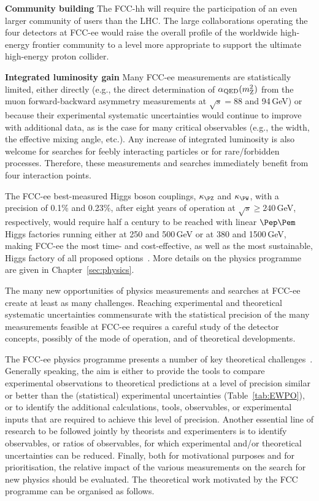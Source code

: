 \begin{tcolorbox}[colback=green!5!white,
                  colframe=green!75!black,
                  title=The benefits of four interaction points
                 ]
{\bf Community building} 
The FCC-hh will require the participation of an even larger community of users than the LHC. 
The large collaborations operating the four detectors at FCC-ee would raise the overall profile of the worldwide high-energy frontier community to a level more appropriate to support the ultimate high-energy proton collider.

{\bf Integrated luminosity gain} 
Many FCC-ee measurements are statistically limited, either directly (e.g., the direct determination of $\alpha_{\rm QED}(m_{\rm Z}^2)$ from the muon forward-backward asymmetry measurements at $\sqrt{s}=88$ and 94\,GeV) or because their experimental systematic uncertainties would continue to improve with additional data, as is the case for many critical observables (e.g., the \PZ width, the effective mixing angle, etc.). 
Any increase of integrated luminosity is also welcome for searches for feebly interacting particles or for rare/forbidden processes. 
Therefore, these measurements and searches immediately benefit from four interaction points. 
\end{tcolorbox}

The FCC-ee best-measured Higgs boson couplings, $\kappa_{\PZ}$ and $\kappa_{\PW}$, with a precision of 0.1\% and 0.23\%, after eight years of operation at $\sqrt{s} \geq 240$\,GeV, respectively, would require half a century to be reached with linear $\Pep\Pem$ Higgs factories running either at 250 and 500\,GeV or at 380 and 1500\,GeV, making FCC-ee the most time- and cost-effective, as well as the most sustainable, Higgs factory of all proposed options~\cite{Janot:2022jtn,Blondel:2024mry}. 
More details on the physics programme are given in Chapter~\ref{sec:physics}. 

The many new opportunities of physics measurements and searches at FCC-ee create at least as many challenges. 
Reaching experimental and theoretical systematic uncertainties commensurate with the statistical precision of the many measurements feasible at FCC-ee requires a careful study of the detector concepts, possibly of the mode of operation, and of theoretical developments. 

The FCC-ee physics programme presents a number of key theoretical challenges~\cite{Heinemeyer:2021rgq}. 
Generally speaking, the aim is either to provide the tools to compare experimental observations to theoretical predictions at a level of precision similar or better than the (statistical) experimental uncertainties (Table~\ref{tab:EWPO}), or to identify the additional calculations, tools, observables, or experimental inputs that are required to achieve this level of precision.
Another essential line of research to be followed jointly by theorists and experimenters is to identify observables, or ratios of observables, for which experimental and/or theoretical uncertainties can be reduced. 
Finally, both for motivational purposes and for prioritisation, the relative impact of the various measurements on the search for new physics should be evaluated. The theoretical work motivated by the FCC programme can be organised as follows.

